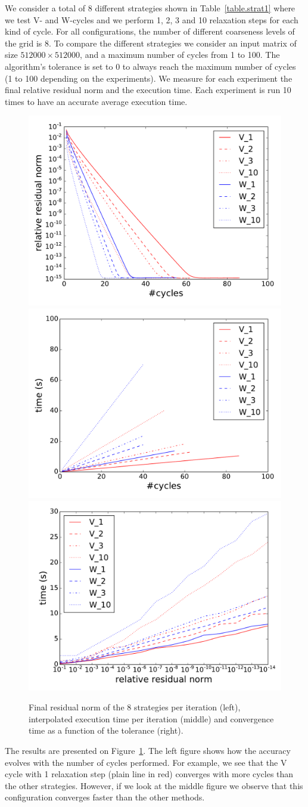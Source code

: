 We consider a total of 8 different strategies shown in Table~\ref{table.strat1}
where we test V- and W-cycles and we perform 1, 2, 3 and 10 relaxation steps
for each kind of cycle.  For all configurations, the number of different
coarseness levels of the grid is 8.  To compare the different strategies we
consider an input matrix of size $512000 \times 512000$, and a maximum number
of cycles from 1 to 100.  The algorithm's tolerance is set to $0$ to always
reach the maximum number of cycles (1 to 100 depending on the experiments). We
measure for each experiment the final relative residual norm and the execution
time. Each experiment is run 10 times to have an accurate average execution
time.

\begin{figure}
    \includegraphics[width=0.33\linewidth]{figs/convergence_1_norm.pdf}
    \includegraphics[width=0.33\linewidth]{figs/convergence_1_time.pdf}
    \includegraphics[width=0.33\linewidth]{figs/time_convergence.pdf}
    \caption{Final residual norm of the 8 strategies per iteration (left),
    interpolated execution time per iteration (middle) and convergence time as
    a function of the tolerance (right).}
  \label{fig.first_tests}
\end{figure}

The results are presented on Figure~\ref{fig.first_tests}.  The left figure
shows how the accuracy evolves with the number of cycles performed.  For
example, we see that the V cycle with 1 relaxation step (plain line in red)
converges with more cycles than the other strategies. However, if we look at
the middle figure we observe that this configuration converges faster than the
other methods.  

